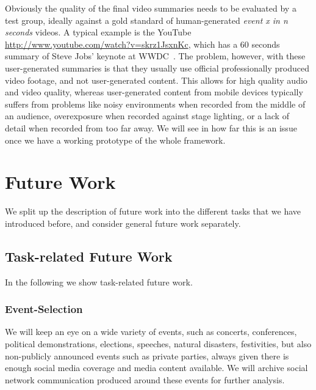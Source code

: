\documentclass[12pt]{article}
\begin{document}
Obviously the quality of the final video summaries needs to be evaluated by a test group, ideally against a gold standard of human-generated \emph{event x in n seconds} videos. A typical example is the YouTube \url{http://www.youtube.com/watch?v=skrz1JsxnKc}, which has a 60 seconds summary of Steve Jobs' keynote at WWDC~\cite{wwdc}. The problem, however, with these user-generated summaries is that they usually use official professionally produced video footage, and not user-generated content. This allows for high quality audio and video quality, whereas user-generated content from mobile devices typically suffers from problems like noisy environments when recorded from the middle of an audience, overexposure when recorded against stage lighting, or a lack of detail when recorded from too far away. We will see in how far this is an issue once we have a working prototype of the whole framework.

\section{Future Work}
We split up the description of future work into the different tasks that we have introduced before, and consider general future work separately.
\subsection{Task-related Future Work}
In the following we show task-related future work.

\subsubsection{Event-Selection}
We will keep an eye on a wide variety of events, such as concerts, conferences, political demonstrations, elections, speeches, natural disasters, festivities, but also non-publicly announced events such as private parties, always given there is enough social media coverage and media content available. We will archive social network communication produced around these events for further analysis.
\end{document}
